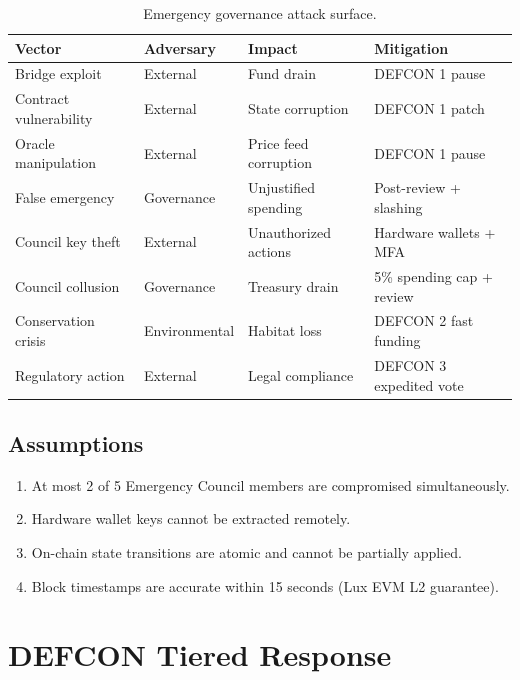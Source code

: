 \documentclass[11pt,letterpaper]{article}
\begin{document}
\begin{table}[h]
\centering
\caption{Emergency governance attack surface.}
\label{tab:attacks}
\begin{tabular}{p{3cm}p{3cm}p{3cm}p{3cm}}
\toprule
\textbf{Vector} & \textbf{Adversary} & \textbf{Impact} & \textbf{Mitigation} \\
\midrule
Bridge exploit & External & Fund drain & DEFCON 1 pause \\
Contract vulnerability & External & State corruption & DEFCON 1 patch \\
Oracle manipulation & External & Price feed corruption & DEFCON 1 pause \\
False emergency & Governance & Unjustified spending & Post-review + slashing \\
Council key theft & External & Unauthorized actions & Hardware wallets + MFA \\
Council collusion & Governance & Treasury drain & 5\% spending cap + review \\
Conservation crisis & Environmental & Habitat loss & DEFCON 2 fast funding \\
Regulatory action & External & Legal compliance & DEFCON 3 expedited vote \\
\bottomrule
\end{tabular}
\end{table}

\subsection{Assumptions}

\begin{enumerate}
    \item At most 2 of 5 Emergency Council members are compromised simultaneously.
    \item Hardware wallet keys cannot be extracted remotely.
    \item On-chain state transitions are atomic and cannot be partially applied.
    \item Block timestamps are accurate within 15 seconds (Lux EVM L2 guarantee).
\end{enumerate}

\section{DEFCON Tiered Response}
\label{sec:defcon}
\end{document}
